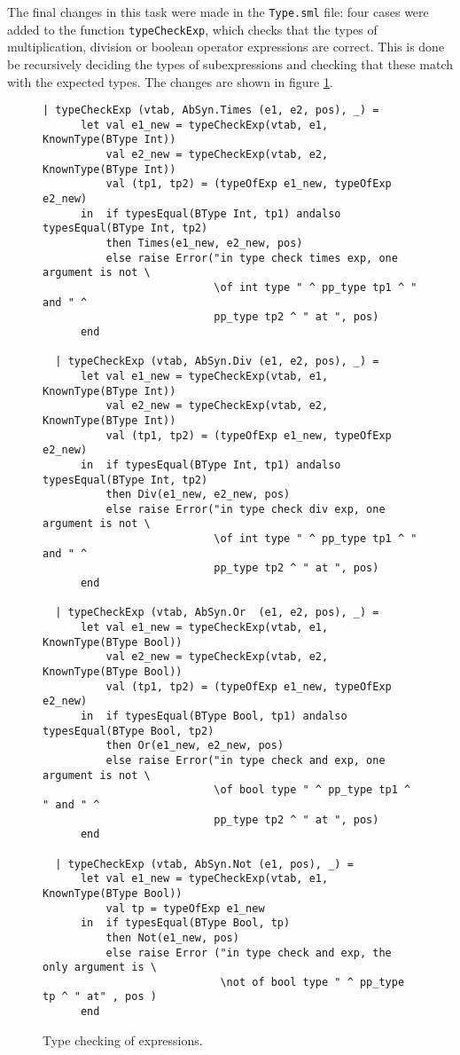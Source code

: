 \noindent
The final changes in this task were made in the \verb|Type.sml| file: four
cases were added to the function \verb|typeCheckExp|, which checks that the
types of multiplication, division or boolean operator expressions are correct.
This is done be recursively deciding the types of subexpressions and checking
that these match with the expected types. The changes are shown in figure
\ref{fig_expTypeCheck}.
\begin{figure}[H]
  \begin{lstlisting}[style=MLStyle]
  | typeCheckExp (vtab, AbSyn.Times (e1, e2, pos), _) =
      let val e1_new = typeCheckExp(vtab, e1, KnownType(BType Int))
          val e2_new = typeCheckExp(vtab, e2, KnownType(BType Int))
          val (tp1, tp2) = (typeOfExp e1_new, typeOfExp e2_new)
      in  if typesEqual(BType Int, tp1) andalso typesEqual(BType Int, tp2)
          then Times(e1_new, e2_new, pos)
          else raise Error("in type check times exp, one argument is not \
                           \of int type " ^ pp_type tp1 ^ " and " ^
                           pp_type tp2 ^ " at ", pos)
      end

  | typeCheckExp (vtab, AbSyn.Div (e1, e2, pos), _) =
      let val e1_new = typeCheckExp(vtab, e1, KnownType(BType Int))
          val e2_new = typeCheckExp(vtab, e2, KnownType(BType Int))
          val (tp1, tp2) = (typeOfExp e1_new, typeOfExp e2_new)
      in  if typesEqual(BType Int, tp1) andalso typesEqual(BType Int, tp2)
          then Div(e1_new, e2_new, pos)
          else raise Error("in type check div exp, one argument is not \
                           \of int type " ^ pp_type tp1 ^ " and " ^
                           pp_type tp2 ^ " at ", pos)
      end

  | typeCheckExp (vtab, AbSyn.Or  (e1, e2, pos), _) =
      let val e1_new = typeCheckExp(vtab, e1, KnownType(BType Bool))
          val e2_new = typeCheckExp(vtab, e2, KnownType(BType Bool))
          val (tp1, tp2) = (typeOfExp e1_new, typeOfExp e2_new)
      in  if typesEqual(BType Bool, tp1) andalso typesEqual(BType Bool, tp2)
          then Or(e1_new, e2_new, pos)        
          else raise Error("in type check and exp, one argument is not \
                           \of bool type " ^ pp_type tp1 ^ " and " ^
                           pp_type tp2 ^ " at ", pos)
      end

  | typeCheckExp (vtab, AbSyn.Not (e1, pos), _) =
      let val e1_new = typeCheckExp(vtab, e1, KnownType(BType Bool))
          val tp = typeOfExp e1_new
      in  if typesEqual(BType Bool, tp)
          then Not(e1_new, pos)
          else raise Error ("in type check and exp, the only argument is \
                            \not of bool type " ^ pp_type tp ^ " at" , pos )
      end
  \end{lstlisting}
  \caption{Type checking of expressions.}
  \label{fig_expTypeCheck}
\end{figure}



